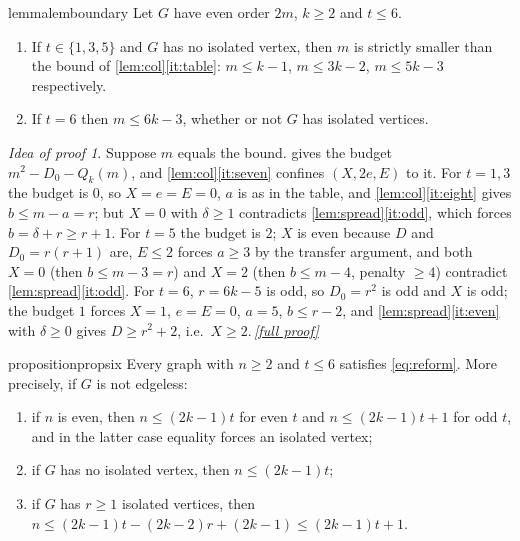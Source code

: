 \documentclass[11pt,a4paper]{article}
\theoremstyle{plain}
\theoremstyle{definition}
\theoremstyle{remark}
\newtheorem*{proofidea}{Idea of proof}
\newcommand{\fullproofref}[1]{\,\hyperref[#1]{\textit{[full proof]}}}
\providecommand{\tightlist}{\setlength{\itemsep}{0pt}\setlength{\parskip}{0pt}}
\begin{document}
\begin{restatable}{lemma}{lemboundary}\label{lem:boundary}
Let $G$ have even order $2m$, $k\ge2$ and $t\le6$.
\begin{enumerate}[label=(\alph*)]\tightlist
\item\label{it:b135} If $t\in\{1,3,5\}$ and $G$ has no isolated vertex, then $m$ is strictly smaller than the bound of \cref{lem:col}\ref{it:table}: $m\le k-1$, $m\le3k-2$, $m\le5k-3$ respectively.
\item\label{it:b6} If $t=6$ then $m\le6k-3$, whether or not $G$ has isolated vertices.
\end{enumerate}
\end{restatable}

\begin{proofidea}
Suppose $m$ equals the bound.  gives the budget $m^2-D_0-Q_k(m)$, and \cref{lem:col}\ref{it:seven} confines $(X,2e,E)$ to it. For $t=1,3$ the budget is $0$, so $X=e=E=0$, $a$ is as in the table, and \cref{lem:col}\ref{it:eight} gives $b\le m-a=r$; but $X=0$ with $\delta\ge1$ contradicts \cref{lem:spread}\ref{it:odd}, which forces $b=\delta+r\ge r+1$. For $t=5$ the budget is $2$; $X$ is even because $D$ and $D_0=r(r+1)$ are, $E\le2$ forces $a\ge3$ by the transfer argument, and both $X=0$ (then $b\le m-3=r$) and $X=2$ (then $b\le m-4$, penalty $\ge4$) contradict \cref{lem:spread}\ref{it:odd}. For $t=6$, $r=6k-5$ is odd, so $D_0=r^2$ is odd and $X$ is odd; the budget $1$ forces $X=1$, $e=E=0$, $a=5$, $b\le r-2$, and \cref{lem:spread}\ref{it:even} with $\delta\ge0$ gives $D\ge r^2+2$, i.e.\ $X\ge2$.\fullproofref{pf:boundary}
\end{proofidea}

\begin{restatable}{proposition}{propsix}\label{prop:t6}
Every graph with $n\ge2$ and $t\le6$ satisfies \eqref{eq:reform}. More precisely, if $G$ is not edgeless:
\begin{enumerate}[label=(\alph*)]\tightlist
\item\label{it:13} if $n$ is even, then $n\le(2k-1)t$ for even $t$ and $n\le(2k-1)t+1$ for odd $t$, and in the latter case equality forces an isolated vertex;
\item\label{it:14} if $G$ has no isolated vertex, then $n\le(2k-1)t$;
\item\label{it:15} if $G$ has $r\ge1$ isolated vertices, then $n\le(2k-1)t-(2k-2)r+(2k-1)\le(2k-1)t+1$.
\end{enumerate}
\end{restatable}
\end{document}
